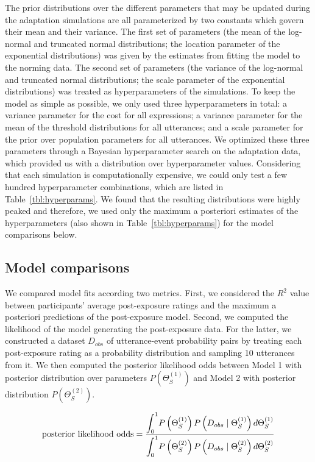 \documentclass[man, floatsintext]{apa6}
\begin{document}
The prior distributions over the different parameters that may be updated during the adaptation simulations are all parameterized by two constants which govern their mean and their variance. The first set of parameters (the mean of the log-normal and truncated normal distributions; the location parameter of the exponential distributions) was given by the estimates from fitting the model to the norming data. The second set of parameters (the variance of the log-normal and truncated normal distributions; the scale parameter of the exponential distributions) was treated as hyperparameters of the simulations. To keep the model as simple as possible, we only used three hyperparameters in total: a variance parameter for the cost for all expressions; a variance parameter for the mean of the threshold distributions for all utterances; and a scale parameter for the prior over population parameters for all utterances. We optimized these three parameters through a Bayesian hyperparameter search on the adaptation data, which provided us with a distribution over hyperparameter values. Considering that each simulation is computationally expensive, we could only test a few hundred hyperparameter combinations, which are listed in Table~\ref{tbl:hyperparams}. We found that the resulting distributions were highly peaked and therefore, we used only the maximum a posteriori estimates of the hyperparameters (also shown in Table~\ref{tbl:hyperparams}) for the model comparisons below.


\subsection{Model comparisons}

We compared model fits according two metrics. First, we considered the $R^2$ value between participants' average post-exposure ratings and the maximum a posteriori predictions of the post-exposure model. Second, we computed the likelihood of the model generating the post-exposure data. For the latter, we constructed a dataset $D_{obs}$ of utterance-event probability pairs by treating each post-exposure rating as a probability distribution and sampling 10 utterances from it. We then computed the posterior likelihood odds between Model 1 with posterior distribution over parameters $P(\Theta_{S}^{(1)})$ and Model 2 with posterior distribution $P(\Theta_{S}^{(2)})$.

$$\mbox{posterior likelihood odds} = \frac{\mathlarger{\int_{0}^{1}} {P\left(\Theta_{S}^{(1)}\right) P\left(D_{obs} \mid \Theta_{S}^{(1)} \right) d   \Theta_{S}^{(1)}}}{\mathlarger{\int_0^1} P\left(\Theta_{S}^{(2)}\right) P\left(D_{obs} \mid \Theta_{S}^{(2)}\right)d   \Theta_{S}^{(2)} }$$
 
\end{document}
